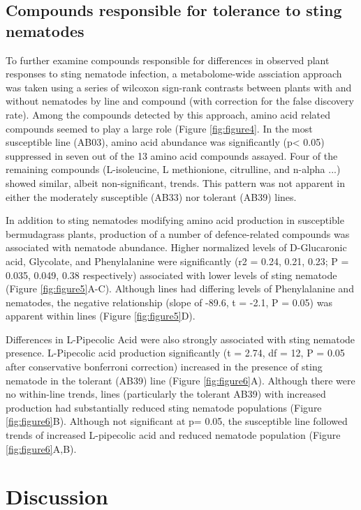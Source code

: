 \documentclass[9pt,lineno]{elife}
\begin{document}
\subsection{Compounds responsible for tolerance to sting nematodes}
To further examine compounds responsible for differences in observed plant responses to sting nematode infection, a metabolome-wide assciation approach was taken using a series of wilcoxon sign-rank contrasts between plants with and without nematodes by line and compound (with correction for the false discovery rate).  Among the compounds detected by this approach, amino acid related compounds seemed to play a large role (Figure \ref{fig:figure4}.  In the most susceptible line (AB03), amino acid abundance was significantly (p< 0.05) suppressed in seven out of the 13 amino acid compounds assayed.  Four of the remaining compounds (L-isoleucine, L methionione, citrulline, and n-alpha ...) showed similar, albeit non-significant, trends.  This pattern was not apparent in either the moderately susceptible (AB33) nor tolerant (AB39) lines.  

In addition to sting nematodes modifying amino acid production in susceptible bermudagrass plants, production of a number of defence-related compounds was associated with nematode abundance.  Higher normalized levels of D-Glucaronic acid, Glycolate, and Phenylalanine were significantly (r2 = 0.24, 0.21, 0.23; P = 0.035, 0.049, 0.38 respectively) associated with lower levels of sting nematode (Figure \ref{fig:figure5}A-C).  Although lines had differing levels of Phenylalanine and nematodes, the negative relationship (slope of -89.6, t = -2.1, P = 0.05) was apparent within lines (Figure \ref{fig:figure5}D).  

Differences in L-Pipecolic Acid were also strongly associated with sting nematode presence. L-Pipecolic acid production significantly (t = 2.74, df = 12, P = 0.05 after conservative bonferroni correction) increased in the presence of sting nematode in the tolerant (AB39) line (Figure \ref{fig:figure6}A).  Although there were no within-line trends, lines (particularly the tolerant AB39) with increased production had substantially reduced sting nematode populations (Figure \ref{fig:figure6}B). Although not significant at p= 0.05, the susceptible line followed trends of increased L-pipecolic acid and reduced nematode population (Figure \ref{fig:figure6}A,B).  

\section{Discussion}
\end{document}
